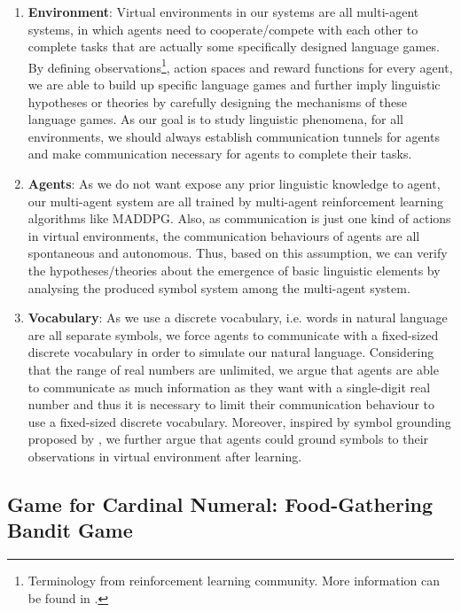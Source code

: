 \documentclass[a4paper,11pt]{article}
\begin{document}
\begin{enumerate}
  \item \textbf{Environment}: Virtual environments in our systems are all multi-agent systems, in which agents need to cooperate/compete with each other to complete tasks that are actually some specifically designed language games. By defining observations\footnote{Terminology from reinforcement learning community. More information can be found in \cite{sutton1998introduction}.}, action spaces and reward functions for every agent, we are able to build up specific language games and further imply linguistic hypotheses or theories by carefully designing the mechanisms of these language games. As our goal is to study linguistic phenomena, for all environments, we should always establish communication tunnels for agents and make communication necessary for agents to complete their tasks.
  \item \textbf{Agents}: As we do not want expose any prior linguistic knowledge to agent, our multi-agent system are all trained by multi-agent reinforcement learning algorithms like MADDPG\cite{lowe2017multi}. Also, as communication is just one kind of actions in virtual environments, the communication behaviours of agents are all spontaneous and autonomous. Thus, based on this assumption, we can verify the hypotheses/theories about the emergence of basic linguistic elements by analysing the produced symbol system among the multi-agent system.
  \item \textbf{Vocabulary}: As we use a discrete vocabulary, i.e. words in natural language are all separate symbols, we force agents to communicate with a fixed-sized discrete vocabulary in order to simulate our natural language. Considering that the range of real numbers are unlimited, we argue that agents are able to communicate as much information as they want with a single-digit real number and thus it is necessary to limit their communication behaviour to use a fixed-sized discrete vocabulary. Moreover, inspired by symbol grounding proposed by \cite{harnad1990symbol}, we further argue that agents could ground symbols to their observations in virtual environment after learning.
\end{enumerate}

\subsection{Game for Cardinal Numeral: Food-Gathering Bandit Game}
\label{ssec:3.2cardinal_game}
\end{document}

